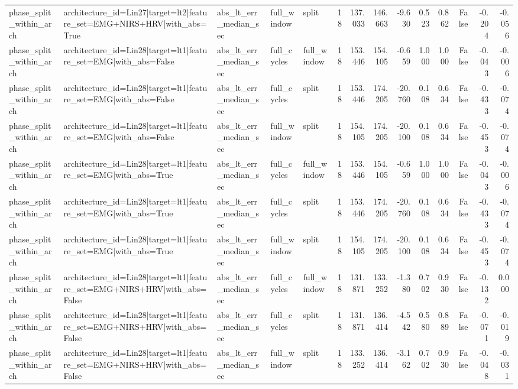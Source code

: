 \begin{table}
\begin{tabular}{lllllrrrrrrrrr}
phase_split_within_arch & architecture_id=Lin27|target=lt2|feature_set=EMG+NIRS+HRV|with_abs=True & abs_lt_err_median_sec & full_window & split & 18 & 137.033 & 146.663 & -9.630 & 0.523 & 0.862 & False & -0.204 & -0.056 \\
phase_split_within_arch & architecture_id=Lin28|target=lt1|feature_set=EMG|with_abs=False & abs_lt_err_median_sec & full_cycles & full_window & 18 & 153.446 & 154.105 & -0.659 & 1.000 & 1.000 & False & -0.043 & -0.006 \\
phase_split_within_arch & architecture_id=Lin28|target=lt1|feature_set=EMG|with_abs=False & abs_lt_err_median_sec & full_cycles & split & 18 & 153.446 & 174.205 & -20.760 & 0.108 & 0.634 & False & -0.433 & -0.074 \\
phase_split_within_arch & architecture_id=Lin28|target=lt1|feature_set=EMG|with_abs=False & abs_lt_err_median_sec & full_window & split & 18 & 154.105 & 174.205 & -20.100 & 0.108 & 0.634 & False & -0.453 & -0.074 \\
phase_split_within_arch & architecture_id=Lin28|target=lt1|feature_set=EMG|with_abs=True & abs_lt_err_median_sec & full_cycles & full_window & 18 & 153.446 & 154.105 & -0.659 & 1.000 & 1.000 & False & -0.043 & -0.006 \\
phase_split_within_arch & architecture_id=Lin28|target=lt1|feature_set=EMG|with_abs=True & abs_lt_err_median_sec & full_cycles & split & 18 & 153.446 & 174.205 & -20.760 & 0.108 & 0.634 & False & -0.433 & -0.074 \\
phase_split_within_arch & architecture_id=Lin28|target=lt1|feature_set=EMG|with_abs=True & abs_lt_err_median_sec & full_window & split & 18 & 154.105 & 174.205 & -20.100 & 0.108 & 0.634 & False & -0.453 & -0.074 \\
phase_split_within_arch & architecture_id=Lin28|target=lt1|feature_set=EMG+NIRS+HRV|with_abs=False & abs_lt_err_median_sec & full_cycles & full_window & 18 & 131.871 & 133.252 & -1.380 & 0.702 & 0.930 & False & -0.132 & 0.000 \\
phase_split_within_arch & architecture_id=Lin28|target=lt1|feature_set=EMG+NIRS+HRV|with_abs=False & abs_lt_err_median_sec & full_cycles & split & 18 & 131.871 & 136.414 & -4.542 & 0.580 & 0.889 & False & -0.071 & -0.019 \\
phase_split_within_arch & architecture_id=Lin28|target=lt1|feature_set=EMG+NIRS+HRV|with_abs=False & abs_lt_err_median_sec & full_window & split & 18 & 133.252 & 136.414 & -3.162 & 0.702 & 0.930 & False & -0.048 & -0.031 \\

\end{tabular}
\end{table}
